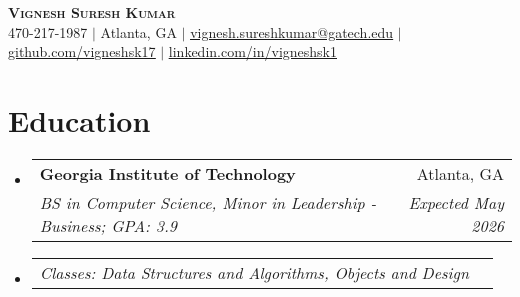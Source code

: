 \documentclass[letterpaper,11pt]{article}
\makeatletter
\newcommand{\resumeItem}[1]{
  \item\small{
    {#1 \vspace{-2pt}}
  }
}
\newcommand{\resumeSubheading}[4]{%
\vspace{-1pt}%
  \item
    \begin{tabular*}{0.97\textwidth}{l@{\extracolsep{\fill}}r}
      \textbf{#1} & #2 \\
      \textit{\small#3} & \textit{\small #4} \\

    \end{tabular*}%
  \vspace{-9pt}
}
\newcommand{\resumeSubSubheading}[2]{
    \item
    \begin{tabular*}{0.97\textwidth}{l@{\extracolsep{\fill}}r}
      \textit{\small#1} & \textit{\small #2} \\
    \end{tabular*}\vspace{-7pt}
}
\newcommand{\resumeSubHeadingListStart}{\begin{itemize}[leftmargin=0.15in, label={}]}
\newcommand{\resumeSubHeadingListEnd}{\end{itemize}}
\newcommand{\resumeItemListStart}{\begin{itemize}}
\newcommand{\resumeItemListEnd}{\end{itemize}\vspace{-5pt}}
\makeatother
\begin{document}

\begin{center}
    \textbf{\Huge \scshape Vignesh Suresh Kumar} \\ \vspace{1pt}
    \small 470-217-1987 $|$ \small Atlanta, GA $|$
    \href{mailto:vignesh.sureshkumar@gatech.edu}{\underline{vignesh.sureshkumar@gatech.edu}} $|$
    \href{https://github.com/VigneshSK17}{\underline{github.com/vigneshsk17}} $|$
    \href{https://www.linkedin.com/in/vigneshsk1}{\underline{linkedin.com/in/vigneshsk1}}
\end{center}


\section{Education}
  \resumeSubHeadingListStart
    \resumeSubheading
      {Georgia Institute of Technology}{Atlanta, GA}
			{BS in Computer Science, Minor in Leadership - Business; GPA: 3.9}{Expected May 2026}
		\resumeSubSubheading
			{Classes: Data Structures and Algorithms, Objects and Design}{}
  \resumeSubHeadingListEnd




\end{document}
